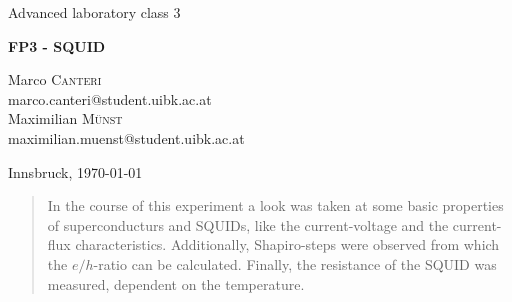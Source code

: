 \documentclass[a4paper,10pt]{article}
\begin{document}
\begin{titlepage}
 \begin{center}
	\Large{Advanced laboratory class 3}
	\end{center}
	\begin{center}
	 \LARGE{\textbf{FP3 - SQUID}}
	\end{center}
	
	\begin{center}
	
	\large Marco \textsc{Canteri} \\
	marco.canteri@student.uibk.ac.at\\
	\large Maximilian \textsc{Münst} \\
	maximilian.muenst@student.uibk.ac.at
	\end{center}
	
	\begin{center}
	\vspace{1cm}
	Innsbruck, \today
	\vspace{1cm}
	\end{center}
	
	\begin{abstract}
    In the course of this experiment a look was taken at some basic properties of superconducturs and SQUIDs, like the current-voltage and the current-flux characteristics. Additionally, Shapiro-steps were observed from which the $e/h$-ratio can be calculated. Finally, the resistance of the SQUID was measured, dependent on the temperature. 
    \end{abstract}
    \vspace{1cm}
	

\end{titlepage}
\end{document}
